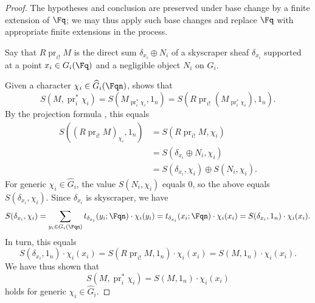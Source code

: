 \begin{proof}

    The hypotheses and conclusion are preserved under base change by a finite extension of $\Fq$; we may thus apply such base changes and replace $\Fq$ with appropriate finite extensions in the process. 

    Say that $R\operatorname{pr}_{i!} M$ is the direct sum $\delta_{x_i} \oplus N_i$ of a skyscraper sheaf $\delta_{x_i}$ supported at a point $x_i \in G_i(\Fq)$ and a negligible object $N_i$ on $G_i$. 
    
    Given a character $\chi_i \in \widehat{G}_i(\Fqn)$,  shows that
    $$S(M, \operatorname{pr}_i^* \chi_i) = S(M_{\operatorname{pr}_i^* \chi_i}, 1_n) = S(R\operatorname{pr}_{i!} (M_{\operatorname{pr}_i^* \chi_i}), 1_n).$$
    By the projection formula , this equals
    \begin{align*}
    S((R\operatorname{pr}_{i!} M)_{\chi_i}, 1_n) &= S(R\operatorname{pr}_{i!} M, \chi_i) \\
    &= S(\delta_{x_i} \oplus N_i, \chi_i) \\
    &= S(\delta_{x_i}, \chi_i) \oplus  S(N_i, \chi_i).
    \end{align*}
    For generic $\chi_i \in \widehat{G}_i$, the value $S(N_i, \chi_i)$ equals $0$, so the above equals 
    $S(\delta_{x_i}, \chi_i)$. Since $\delta_{x_i}$ is skyscraper, we have 
    $$S(\delta_{x_i}, \chi_i) = \sum_{y_i \in G_i(\Fqn)} t_{\delta_{x_i}}(y_i; \Fqn) \cdot \chi_i(y_i) = t_{\delta_{x_i}}(x_i; \Fqn) \cdot \chi_i(x_i) = S(\delta_{x_i}, 1_n) \cdot \chi_i(x_i).$$
    In turn, this equals 
    $$S(\delta_{x_i}, 1_n) \cdot \chi_i(x_i) = S(R\operatorname{pr}_{i!} M, 1_n) \cdot \chi_i(x_i) = S(M, 1_n) \cdot \chi_i(x_i).$$
    We have thus shown that 
    \begin{equation} \label{eq:applying_character_on_component_group_to_arithmetic_fourier_transform_of_an_object_whose_pushforward_is_skyscraper_plus_negligible_multiplies_the_value_by_the_character_value_at_the_point}
    S(M, \operatorname{pr}_i^* \chi_i) = S(M, 1_n) \cdot \chi_i(x_i)
    \end{equation}
    holds for generic $\chi_i \in \widehat{G}_i$. 


\end{proof}
